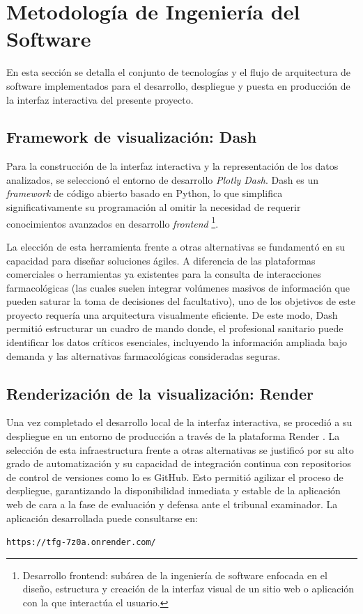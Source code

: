 \section{Metodología de Ingeniería del Software}
En esta sección se detalla el conjunto de tecnologías y el flujo de arquitectura de software implementados para el desarrollo, despliegue y puesta en producción de la interfaz interactiva del presente proyecto.

\subsection*{Framework de visualización: Dash}
Para la construcción de la interfaz interactiva y la representación de los datos analizados, se seleccionó el entorno de desarrollo \textit{Plotly Dash}. Dash es un \textit{framework} de código abierto basado en Python, lo que simplifica significativamente su programación al omitir la necesidad de requerir conocimientos avanzados en desarrollo \textit{frontend} \footnote{Desarrollo frontend: subárea de la ingeniería de software enfocada en el diseño, estructura y creación de la interfaz visual de un sitio web o aplicación con la que interactúa el usuario.}.

La elección de esta herramienta frente a otras alternativas se fundamentó en su capacidad para diseñar soluciones ágiles. A diferencia de las plataformas comerciales o herramientas ya existentes para la consulta de interacciones farmacológicas (las cuales suelen integrar volúmenes masivos de información que pueden saturar la toma de decisiones del facultativo), uno de los objetivos de este proyecto requería una arquitectura visualmente eficiente. De este modo, Dash permitió estructurar un cuadro de mando donde, el profesional sanitario puede identificar los datos críticos esenciales, incluyendo la información ampliada bajo demanda y las alternativas farmacológicas consideradas seguras.

\subsection*{Renderización de la visualización: Render}
Una vez completado el desarrollo local de la interfaz interactiva, se procedió a su despliegue en un entorno de producción a través de 
la plataforma Render \cite{render}. La selección de esta infraestructura frente a otras alternativas se justificó por su alto grado de 
automatización y su capacidad de integración continua con repositorios de control de versiones como lo es GitHub.
Esto permitió agilizar el proceso de despliegue, garantizando la disponibilidad inmediata y estable de la aplicación web de cara a la fase de evaluación y defensa ante el tribunal examinador.
La aplicación desarrollada puede consultarse en:
\begin{center}
    \texttt{https://tfg-7z0a.onrender.com/}
\end{center}

